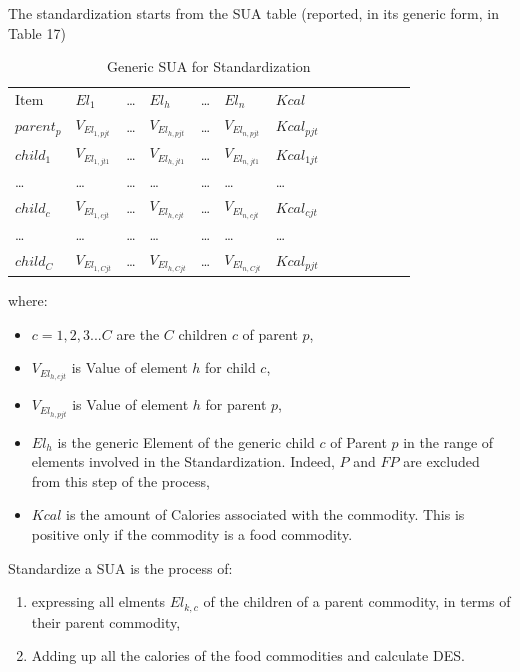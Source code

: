 \documentclass[]{article}
\providecommand{\tightlist}{%
  \setlength{\itemsep}{0pt}\setlength{\parskip}{0pt}}
\begin{document}
The standardization starts from the SUA table (reported, in its generic
form, in Table 17)

\begin {table}[H]
\begin{center}
\caption {Generic SUA for Standardization}

\begin{tabular}{lllllllllllll}
 & & & & & \\
  \hline
Item & $El_{1}$ & … & $El_{h}$ & … & $El_{n}$ & $Kcal$\\ 
  \hline
$parent_{p}$ & $V_{El_{1,pjt}}$ & … & $V_{El_{h,pjt}}$ & … & $V_{El_{n,pjt}}$ & $Kcal_{pjt}$\\ 
$child_{1}$ & $V_{El_{1,jt1}}$ & … & $V_{El_{h,jt1}}$ & … & $V_{El_{n,jt1}}$ & $Kcal_{1jt}$\\ 
… & … & … & … & … & … & … \\ 
$child_{c}$ & $V_{El_{1,cjt}}$ & … & $V_{El_{h,cjt}}$ & … & $V_{El_{n,cjt}}$ & $Kcal_{cjt}$\\ 
… & … & … & … & … & … & … \\ 
$child_{C}$ & $V_{El_{1,Cjt}}$ & … & $V_{El_{h,Cjt}}$ & … & $V_{El_{n,Cjt}}$ & $Kcal_{pjt}$\\ 
   \hline
\end{tabular}
\end{center}
\end {table}

where:

\begin{itemize}
\tightlist
\item
  \(c = 1,2,3...C\) are the \(C\) children \(c\) of parent \(p\),
\item
  \(V_{El_{h,cjt}}\) is Value of element \(h\) for child \(c\),
\item
  \(V_{El_{h,pjt}}\) is Value of element \(h\) for parent \(p\),
\item
  \(El_{h}\) is the generic Element of the generic child \(c\) of Parent
  \(p\) in the range of elements involved in the Standardization.
  Indeed, \(P\) and \(FP\) are excluded from this step of the process,
\item
  \(Kcal\) is the amount of Calories associated with the commodity. This
  is positive only if the commodity is a food commodity.
\end{itemize}

Standardize a SUA is the process of:

\begin{enumerate}
\def\labelenumi{\alph{enumi}.}
\tightlist
\item
  expressing all elments \(El_{k,c}\) of the children of a parent
  commodity, in terms of their parent commodity,
\item
  Adding up all the calories of the food commodities and calculate DES.
\end{enumerate}
\end{document}
